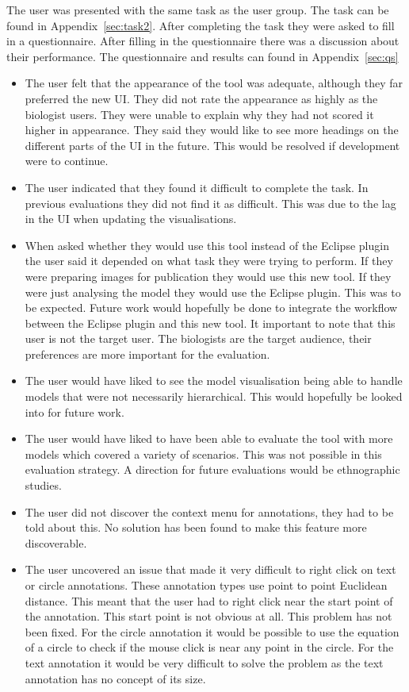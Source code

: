 The user was presented with the same task as the user group.  The task can be found in Appendix~\ref{sec:task2}.  After completing the task they were asked to fill in a questionnaire.  After filling in the questionnaire there was a discussion about their performance.  The questionnaire and results can found in Appendix~\ref{sec:qs}

\begin{itemize}
\item The user felt that the appearance of the tool was adequate, although they far preferred the new \ac{UI}.  They did not rate the appearance as highly as the biologist users.  They were unable to explain why they had not scored it higher in appearance.  They said they would like to see more headings on the different parts of the \ac{UI} in the future.  This would be resolved if development were to continue.
\item The user indicated that they found it difficult to complete the task.  In previous evaluations they did not find it as difficult.  This was due to the lag in the \ac{UI} when updating the visualisations.
\item When asked whether they would use this tool instead of the Eclipse plugin the user said it depended on what task they were trying to perform.  If they were preparing images for publication they would use this new tool.  If they were just analysing the model they would use the Eclipse plugin.  This was to be expected.  Future work would hopefully be done to integrate the workflow between the Eclipse plugin and this new tool.  It important to note that this user is not the target user.  The biologists are the target audience, their preferences are more important for the evaluation.
\item The user would have liked to see the model visualisation being able to handle models that were not necessarily hierarchical.  This would hopefully be looked into for future work.
\item The user would have liked to have been able to evaluate the tool with more models which covered a variety of scenarios.  This was not possible in this evaluation strategy. A direction for future evaluations would be ethnographic studies.
\item The user did not discover the context menu for annotations, they had to be told about this.  No solution has been found to make this feature more discoverable.
\item The user uncovered an issue that made it very difficult to right click on text or circle annotations.  These annotation types use point to point Euclidean distance.  This meant that the user had to right click near the start point of the annotation.  This start point is not obvious at all.  This problem has not been fixed.  For the circle annotation it would be possible to use the equation of a circle to check if the mouse click is near any point in the circle.  For the text annotation it would be very difficult to solve the problem as the text annotation has no concept of its size.
\end{itemize}

